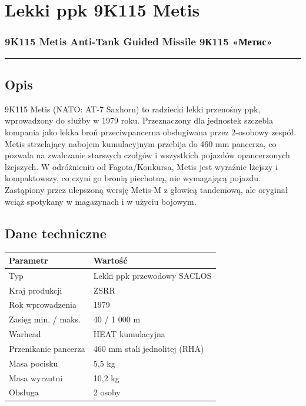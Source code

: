 \documentclass[12pt,openany,oneside]{book}
\begin{document}
\chapter{Lekki ppk 9K115 Metis}\label{lekki-ppk-9k115-metis}

\subsection{9K115 Metis Anti-Tank Guided Missile \textbar{} 9К115
«Метис»}\label{k115-metis-anti-tank-guided-missile-9ux43a115-ux43cux435ux442ux438ux441}

\begin{center}\rule{0.5\linewidth}{0.5pt}\end{center}

\section{Opis}\label{opis-36}

9K115 Metis (NATO: AT-7 Saxhorn) to radziecki lekki przenośny ppk,
wprowadzony do służby w 1979 roku. Przeznaczony dla jednostek szczebla
kompania jako lekka broń przeciwpancerna obsługiwana przez 2-osobowy
zespół. Metis strzelający nabojem kumulacyjnym przebija do 460 mm
pancerza, co pozwala na zwalczanie starszych czołgów i wszystkich
pojazdów opancerzonych lżejszych. W odróżnieniu od Fagota/Konkursa,
Metis jest wyraźnie lżejszy i kompaktowszy, co czyni go bronią
piechotną, nie wymagającą pojazdu. Zastąpiony przez ulepszoną wersję
Metis-M z głowicą tandemową, ale oryginał wciąż spotykany w magazynach i
w użyciu bojowym.

\section{Dane techniczne}\label{dane-techniczne-36}

\begin{longtable}[]{@{}ll@{}}
\toprule\noalign{}
Parametr & Wartość \\
\midrule\noalign{}
\endhead
\bottomrule\noalign{}
\endlastfoot
Typ & Lekki ppk przewodowy SACLOS \\
Kraj produkcji & ZSRR \\
Rok wprowadzenia & 1979 \\
Zasięg min. / maks. & 40 / 1 000 m \\
Warhead & HEAT kumulacyjna \\
Przenikanie pancerza & 460 mm stali jednolitej (RHA) \\
Masa pocisku & 5,5 kg \\
Masa wyrzutni & 10,2 kg \\
Obsługa & 2 osoby \\
\end{longtable}
\end{document}
